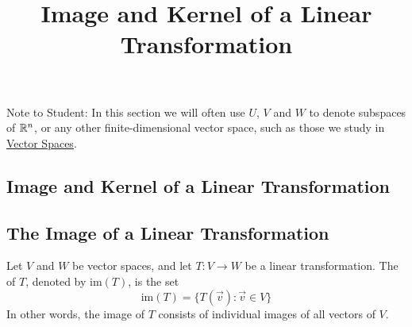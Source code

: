\documentclass{ximera}
\title{Image and Kernel of a Linear Transformation} \license{CC BY-NC-SA 4.0}
\begin{document}
\begin{abstract}
 \end{abstract}
\maketitle

Note to Student:  In this section we will often use $U$, $V$ and $W$ to denote subspaces of $\mathbb{R}^n$, or any other finite-dimensional vector space, such as those we study in \href{https://ximera.osu.edu/linearalgebradzv3/LinearAlgebraInteractiveIntro/XLAChapter_vecSpaces/main}{Vector Spaces}. 

\begin{onlineOnly}
\section*{Image and Kernel of a Linear Transformation}
\end{onlineOnly}

\subsection*{The Image of a Linear Transformation}
\begin{definition}\label{def:imageofT}
Let $V$ and $W$ be vector spaces, and let $T:V\rightarrow W$ be a linear transformation.  The  of $T$, denoted by $\mbox{im}(T)$, is the set
$$\mbox{im}(T)=\{T(\vec{v}):\vec{v}\in V\}$$
In other words, the image of $T$ consists of individual images of all vectors of $V$.
\end{definition}
\end{document}
